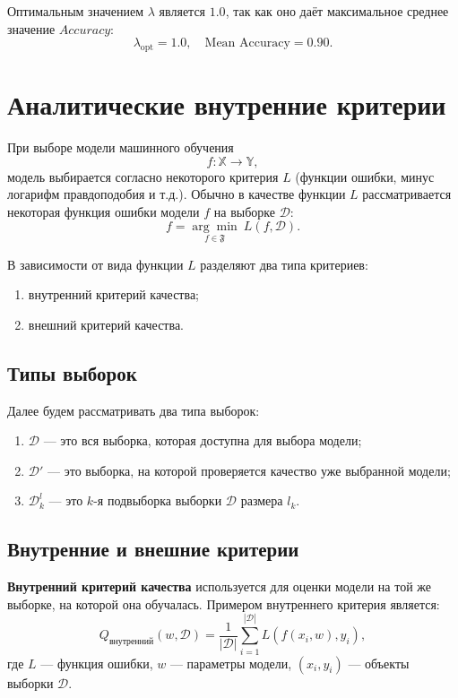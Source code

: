 Оптимальным значением $\lambda$ является $1.0$, так как оно даёт максимальное среднее значение $Accuracy$:
\[
    \lambda_{\text{opt}} = 1.0, \quad \text{Mean Accuracy} = 0.90.
\]

\section*{Аналитические внутренние критерии}

При выборе модели машинного обучения
\[
    f : \mathbb{X} \to \mathbb{Y},
\]
модель выбирается согласно некоторого критерия $L$ (функции ошибки, минус логарифм правдоподобия и т.д.). Обычно в качестве функции $L$ рассматривается некоторая функция ошибки модели $f$ на выборке $\mathcal{D}$:
\[
    f = \underset{f \in \mathfrak{F}}{\arg\min} \ L(f, \mathcal{D}).
\]

В зависимости от вида функции $L$ разделяют два типа критериев:
\begin{enumerate}
    \item внутренний критерий качества;
    \item внешний критерий качества.
\end{enumerate}

\subsection*{Типы выборок}
Далее будем рассматривать два типа выборок:
\begin{enumerate}
    \item $\mathcal{D}$ --- это вся выборка, которая доступна для выбора модели;
    \item $\mathcal{D}'$ --- это выборка, на которой проверяется качество уже выбранной модели;
    \item $\mathcal{D}^l_k$ --- это $k$-я подвыборка выборки $\mathcal{D}$ размера $l_k$.
\end{enumerate}

\subsection*{Внутренние и внешние критерии}
\textbf{Внутренний критерий качества} используется для оценки модели на той же выборке, на которой она обучалась. Примером внутреннего критерия является:
\[
    Q_{\text{внутренний}}(w, \mathcal{D}) = \frac{1}{|\mathcal{D}|} \sum_{i=1}^{|\mathcal{D}|} L(f(x_i, w), y_i),
\]
где $L$ --- функция ошибки, $w$ --- параметры модели, $(x_i, y_i)$ --- объекты выборки $\mathcal{D}$.

